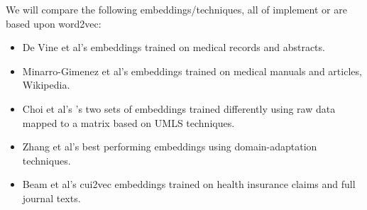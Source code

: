 \documentclass[10pt]{article}
\begin{document}
We will compare the following embeddings/techniques, all of implement or are based upon word2vec:
\begin{itemize}
	\item De Vine et al's  embeddings trained on medical records and abstracts.  
	\item Minarro-Gimenez et al's  embeddings trained on medical manuals and articles, Wikipedia.
	\item Choi et al's 's two sets of embeddings trained differently using raw data mapped to a matrix based on UMLS techniques.  
	\item Zhang et al's  best performing embeddings using domain-adaptation techniques. 
	\item Beam et al's cui2vec embeddings trained on health insurance claims and full journal texts. 
\end{itemize}
\end{document}
